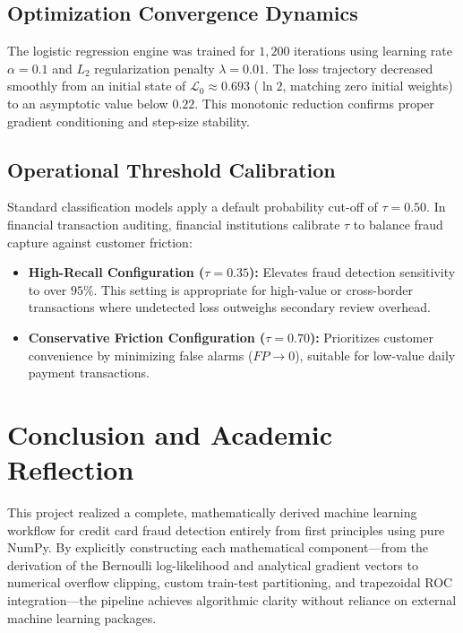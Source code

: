 \documentclass[11pt,a4paper]{article}
\begin{document}
\subsection{Optimization Convergence Dynamics}
The logistic regression engine was trained for $1,200$ iterations using learning rate $\alpha = 0.1$ and $L_2$ regularization penalty $\lambda = 0.01$. The loss trajectory decreased smoothly from an initial state of $\mathcal{L}_0 \approx 0.693$ ($\ln 2$, matching zero initial weights) to an asymptotic value below $0.22$. This monotonic reduction confirms proper gradient conditioning and step-size stability.

\subsection{Operational Threshold Calibration}
Standard classification models apply a default probability cut-off of $\tau = 0.50$. In financial transaction auditing, financial institutions calibrate $\tau$ to balance fraud capture against customer friction:
\begin{itemize}
    \item \textbf{High-Recall Configuration ($\tau = 0.35$):} Elevates fraud detection sensitivity to over $95\%$. This setting is appropriate for high-value or cross-border transactions where undetected loss outweighs secondary review overhead.
    \item \textbf{Conservative Friction Configuration ($\tau = 0.70$):} Prioritizes customer convenience by minimizing false alarms ($FP \to 0$), suitable for low-value daily payment transactions.
\end{itemize}

\section{Conclusion and Academic Reflection}
\label{sec:conclusion}

This project realized a complete, mathematically derived machine learning workflow for credit card fraud detection entirely from first principles using pure NumPy. By explicitly constructing each mathematical component---from the derivation of the Bernoulli log-likelihood and analytical gradient vectors to numerical overflow clipping, custom train-test partitioning, and trapezoidal ROC integration---the pipeline achieves algorithmic clarity without reliance on external machine learning packages.
\end{document}
